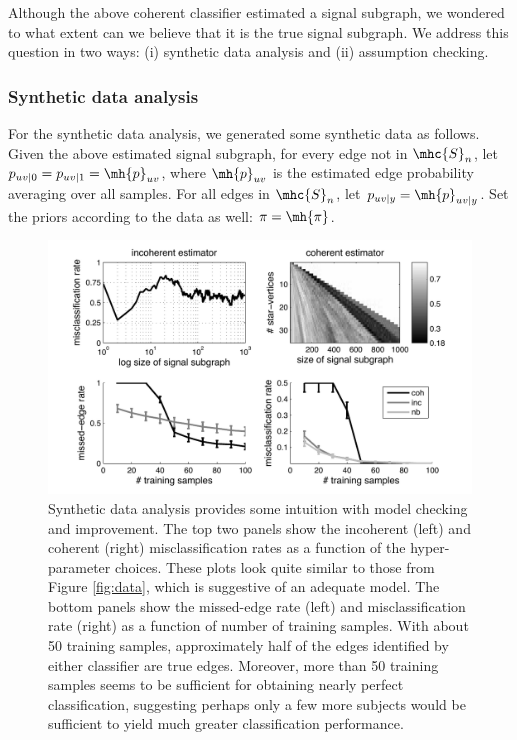 \documentclass[10pt,journal,cspaper,compsoc]{IEEEtran}
\begin{document}
Although the above coherent classifier estimated a signal subgraph, we wondered to what extent can we believe that it is the true signal subgraph.  We address this question in two ways:  (i) synthetic data analysis and (ii) assumption checking.  

\subsubsection{Synthetic data analysis} %
\label{ssub:synthetic_data_analysis}

For the synthetic data analysis, we generated some synthetic data as follows.  Given the above estimated signal subgraph, for every edge not in $\mhc{S}_{n}$, let $p_{uv|0}=p_{uv|1}=\mh{p}_{uv}$, where $\mh{p}_{uv}$ is the estimated edge probability averaging over all samples.  For all edges in $\mhc{S}_{n}$, let $p_{uv|y}=\mh{p}_{uv|y}$.  Set the priors according to the data as well: $\pi=\mh{\pi}$.  

\begin{figure}[tb!]
	\centering
		\includegraphics[width=0.7\linewidth]{../figs/BLSA0317_Count_synthetic_Lhats.pdf}
	\caption{Synthetic data analysis provides some intuition with model checking and improvement.  The top two panels show the incoherent (left) and coherent (right) misclassification rates as a function of the hyper-parameter choices.  These plots look quite similar to those from Figure \ref{fig:data}, which is suggestive of an adequate model.  The bottom panels show the missed-edge rate (left) and misclassification rate (right) as a function of number of training samples.  With about 50 training samples, approximately half of the edges identified by either classifier are true edges.  Moreover, more than 50 training samples seems to be sufficient for obtaining nearly perfect classification, suggesting perhaps only a few more subjects would be sufficient to yield much greater classification performance.}
	\label{fig:synthetic}
\end{figure}
\end{document}

